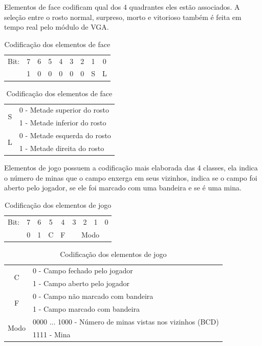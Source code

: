 \documentclass[12pt]{article}
\begin{document}
Elementos de face codificam qual dos 4 quadrantes eles estão associados.
A seleção entre o rosto normal, surpreso, morto e vitorioso também é
feita em tempo real pelo módulo de VGA.

\begin{table}[ht!]
\centering
\begin{tabular}{l|c|c|c|c|c|c|c|c|}
\cline{2-9}
Bit: & 7 & 6 & 5 & 4 & 3 & 2 & 1 & 0 \\
\cline{2-9}
 & 1 & 0 & 0 & 0 & 0 & 0 & S & L \\
\cline{2-9}
\end{tabular}

\vspace{5mm}

\begin{tabular}{|c|l|}
\hline
\multirow{2}{*}{S} & 0 - Metade superior do rosto \\
				   & 1 - Metade inferior do rosto \\
\hline
\multirow{2}{*}{L} & 0 - Metade esquerda do rosto \\
				   & 1 - Metade direita do rosto \\
\hline
\end{tabular}

\caption{Codificação dos elementos de face}
\label{tab:faceenc}
\end{table}

Elementos de jogo possuem a codificação mais elaborada das 4 classes, ela
indica o número de minas que o campo enxerga em seus vizinhos, indica se o
campo foi aberto pelo jogador, se ele foi marcado com uma bandeira e se é uma
mina.

\begin{table}[ht!]
\centering
\begin{tabular}{l|c|c|c|c|c|c|c|c|}
\cline{2-9}
Bit: & 7 & 6 & 5 & 4 & 3 & 2 & 1 & 0 \\
\cline{2-9}
 & 0 & 1 & C & F & \multicolumn{4}{c|}{Modo}\\
\cline{2-9}
\end{tabular}

\vspace{5mm}

\begin{tabular}{|c|l|}
\hline
\multirow{2}{*}{C} & 0 - Campo fechado pelo jogador \\
				   & 1 - Campo aberto pelo jogador \\
\hline				   
\multirow{2}{*}{F} & 0 - Campo não marcado com bandeira \\
				   & 1 - Campo marcado com bandeira \\				   
\hline
\multirow{2}{*}{Modo} & 0000 ... 1000 - Número de minas vistas nos vizinhos (BCD) \\
					  & 1111 - Mina \\
\hline
\end{tabular}

\caption{Codificação dos elementos de jogo}
\label{tab:gameenc}
\end{table}
\end{document}
